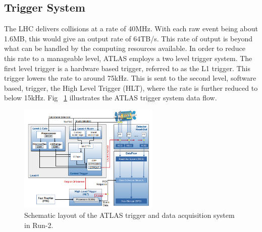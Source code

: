 \subsection{Trigger System}
The LHC delivers collisions at a rate of 40MHz. With each raw event being about 1.6MB, this would give an output rate of 64TB/s. This rate of output is beyond what can be handled by the computing resources available. In order to reduce this rate to a manageable level, ATLAS employs a two level trigger system. The first level trigger is a hardware based trigger, referred to as the L1 trigger. This trigger lowers the rate to around 75kHz. This is sent to the second level, software based, trigger, the High Level Trigger (HLT), where the rate is further reduced to below 15kHz.  Fig ~\ref{fig:TDAQ} illustrates the ATLAS trigger system data flow.\linebreak

\begin{figure}[h]
\begin{center}
\includegraphics*[width=0.60\textwidth] {figures/run2TDAQ}%
\caption[Schematic layout of the ATLAS trigger and data acquisition system in Run-2.]{Schematic layout of the ATLAS trigger and data acquisition system in Run-2.\cite{Ruiz-Martinez:2133909}}
\label{fig:TDAQ}
\end{center}
\end{figure}

